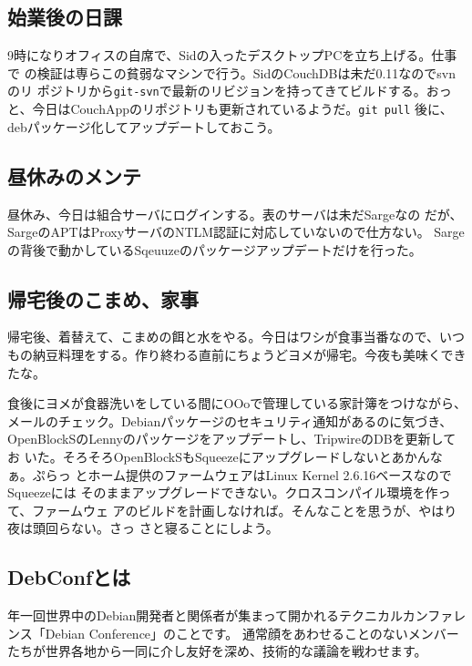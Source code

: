\documentclass[mingoth,a4paper]{jsarticle}
\begin{document}
\subsection{始業後の日課}
9時になりオフィスの自席で、Sidの入ったデスクトップPCを立ち上げる。仕事で
の検証は専らこの貧弱なマシンで行う。SidのCouchDBは未だ0.11なのでsvnのリ
ポジトリから\texttt{git-svn}で最新のリビジョンを持ってきてビルドする。おっ
と、今日はCouchAppのリポジトリも更新されているようだ。\texttt{git pull}
後に、debパッケージ化してアップデートしておこう。

\subsection{昼休みのメンテ}
昼休み、今日は組合サーバにログインする。表のサーバは未だSargeなの
だが、SargeのAPTはProxyサーバのNTLM認証に対応していないので仕方ない。
Sargeの背後で動かしているSqeuuzeのパッケージアップデートだけを行った。

\subsection{帰宅後のこまめ、家事}
帰宅後、着替えて、こまめの餌と水をやる。今日はワシが食事当番なので、いつ
もの納豆料理をする。作り終わる直前にちょうどヨメが帰宅。今夜も美味くでき
たな。

食後にヨメが食器洗いをしている間にOOoで管理している家計簿をつけながら、
メールのチェック。Debianパッケージのセキュリティ通知があるのに気づき、
OpenBlockSのLennyのパッケージをアップデートし、TripwireのDBを更新してお
いた。そろそろOpenBlockSもSqueezeにアップグレードしないとあかんなぁ。ぷらっ
とホーム提供のファームウェアはLinux Kernel 2.6.16ベースなのでSqueezeには
そのままアップグレードできない。クロスコンパイル環境を作って、ファームウェ
アのビルドを計画しなければ。そんなことを思うが、やはり夜は頭回らない。さっ
さと寝ることにしよう。


\label{sec:debconfreportsummary}

\subsection{DebConfとは}
年一回世界中のDebian開発者と関係者が集まって開かれるテクニカルカンファレンス「Debian Conference」のことです。
通常顔をあわせることのないメンバーたちが世界各地から一同に介し友好を深め、技術的な議論を戦わせます。
\end{document}
